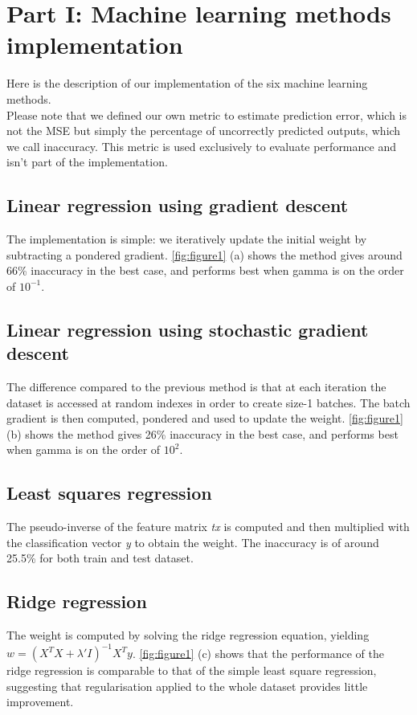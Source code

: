 \documentclass[10pt,conference,compsocconf]{IEEEtran}
\begin{document}
\section{Part I: Machine learning methods implementation}
Here is the description of our implementation of the six machine learning methods.\\
Please note that we defined our own metric to estimate prediction error, which is not the MSE but simply the percentage of uncorrectly predicted outputs, which we call inaccuracy. 
This metric is used exclusively to evaluate performance and isn't part of the implementation.
 \subsection{Linear regression using gradient descent}
The implementation is simple: we iteratively update the initial weight by subtracting a pondered gradient.
\ref{fig:figure1} (a) shows the method gives around 66\% inaccuracy in the best case, and performs best when gamma is on the order of $10^{-1}$. 
\subsection{Linear regression using stochastic gradient descent}
The difference compared to the previous method is that at each iteration the dataset is accessed at random indexes in order to
create size-1 batches. The batch gradient is then computed, pondered and used to update the weight.
\ref{fig:figure1} (b) shows the method gives 26\% inaccuracy in the best case, and performs best when gamma is on the order of $10^{2}$. 
\subsection{Least squares regression}
The pseudo-inverse of the feature matrix \textit{tx} is computed and then multiplied with the classification vector \textit{y} to obtain the weight.
The inaccuracy is of around 25.5\% for both train and test dataset.
\subsection{Ridge regression}
The weight is computed by solving the ridge regression equation, yielding $w = (X^{T}X + \lambda'I)^{-1}X^{T}y$.
\ref{fig:figure1} (c) shows that the performance of the ridge regression is comparable to that of the simple least square regression, suggesting that regularisation applied to the whole dataset provides little improvement.
\end{document}

